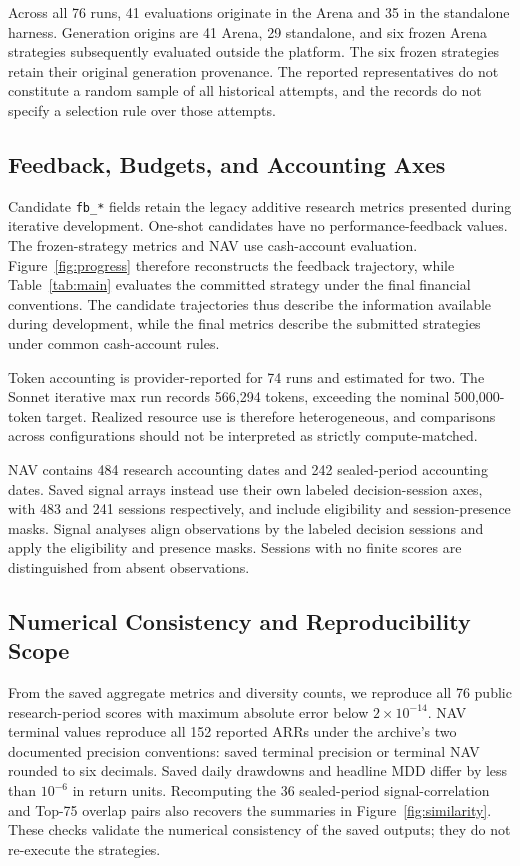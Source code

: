 Across all 76 runs, 41 evaluations originate in the Arena and 35 in the standalone harness. Generation origins are 41 Arena, 29 standalone, and six frozen Arena strategies subsequently evaluated outside the platform. The six frozen strategies retain their original generation provenance. The reported representatives do not constitute a random sample of all historical attempts, and the records do not specify a selection rule over those attempts.

\subsection{Feedback, Budgets, and Accounting Axes}

Candidate \texttt{fb\_*} fields retain the legacy additive research metrics presented during iterative development. One-shot candidates have no performance-feedback values. The frozen-strategy metrics and NAV use cash-account evaluation. Figure~\ref{fig:progress} therefore reconstructs the feedback trajectory, while Table~\ref{tab:main} evaluates the committed strategy under the final financial conventions. The candidate trajectories thus describe the information available during development, while the final metrics describe the submitted strategies under common cash-account rules.

Token accounting is provider-reported for 74 runs and estimated for two. The Sonnet iterative max run records 566,294 tokens, exceeding the nominal 500,000-token target. Realized resource use is therefore heterogeneous, and comparisons across configurations should not be interpreted as strictly compute-matched.

NAV contains 484 research accounting dates and 242 sealed-period accounting dates. Saved signal arrays instead use their own labeled decision-session axes, with 483 and 241 sessions respectively, and include eligibility and session-presence masks. Signal analyses align observations by the labeled decision sessions and apply the eligibility and presence masks. Sessions with no finite scores are distinguished from absent observations.

\subsection{Numerical Consistency and Reproducibility Scope}

From the saved aggregate metrics and diversity counts, we reproduce all 76 public research-period scores with maximum absolute error below $2\times10^{-14}$. NAV terminal values reproduce all 152 reported ARRs under the archive's two documented precision conventions: saved terminal precision or terminal NAV rounded to six decimals. Saved daily drawdowns and headline MDD differ by less than $10^{-6}$ in return units. Recomputing the 36 sealed-period signal-correlation and Top-75 overlap pairs also recovers the summaries in Figure~\ref{fig:similarity}. These checks validate the numerical consistency of the saved outputs; they do not re-execute the strategies.

